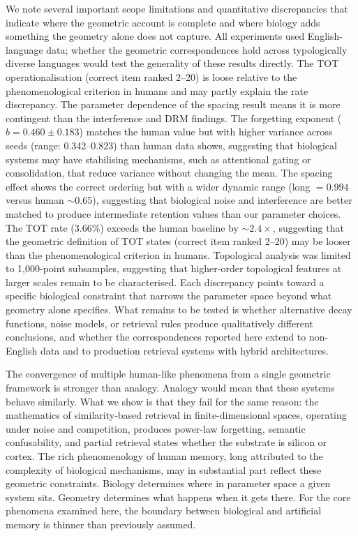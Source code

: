 \documentclass[11pt]{article}
\begin{document}
We note several important scope limitations and quantitative discrepancies that indicate where the geometric account is complete and where biology adds something the geometry alone does not capture. All experiments used English-language data; whether the geometric correspondences hold across typologically diverse languages would test the generality of these results directly. The TOT operationalisation (correct item ranked 2--20) is loose relative to the phenomenological criterion in humans and may partly explain the rate discrepancy. The parameter dependence of the spacing result means it is more contingent than the interference and DRM findings. The forgetting exponent ($b = 0.460 \pm 0.183$) matches the human value but with higher variance across seeds (range: 0.342--0.823) than human data shows, suggesting that biological systems may have stabilising mechanisms, such as attentional gating or consolidation, that reduce variance without changing the mean. The spacing effect shows the correct ordering but with a wider dynamic range (long $= 0.994$ versus human ${\sim}0.65$), suggesting that biological noise and interference are better matched to produce intermediate retention values than our parameter choices. The TOT rate ($3.66\%$) exceeds the human baseline by ${\sim}2.4\times$, suggesting that the geometric definition of TOT states (correct item ranked 2--20) may be looser than the phenomenological criterion in humans. Topological analysis was limited to 1{,}000-point subsamples, suggesting that higher-order topological features at larger scales remain to be characterised. Each discrepancy points toward a specific biological constraint that narrows the parameter space beyond what geometry alone specifies. What remains to be tested is whether alternative decay functions, noise models, or retrieval rules produce qualitatively different conclusions, and whether the correspondences reported here extend to non-English data and to production retrieval systems with hybrid architectures.

The convergence of multiple human-like phenomena from a single geometric framework is stronger than analogy. Analogy would mean that these systems behave similarly. What we show is that they fail for the same reason: the mathematics of similarity-based retrieval in finite-dimensional spaces, operating under noise and competition, produces power-law forgetting, semantic confusability, and partial retrieval states whether the substrate is silicon or cortex. The rich phenomenology of human memory, long attributed to the complexity of biological mechanisms, may in substantial part reflect these geometric constraints. Biology determines where in parameter space a given system sits. Geometry determines what happens when it gets there. For the core phenomena examined here, the boundary between biological and artificial memory is thinner than previously assumed.
\end{document}
